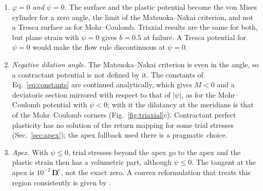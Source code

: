 \documentclass[11pt,a4paper]{article}
\begin{document}
\begin{enumerate}
  \item \emph{$\varphi = 0$ and $\psi = 0$.} The surface and the plastic potential become the
        von Mises cylinder for a zero angle, the limit of the Matsuoka--Nakai criterion, and not
        a Tresca surface as for Mohr--Coulomb. Triaxial results are the same for both, but plane
        strain with $\psi = 0$ gives $b = 0.5$ at failure. A Tresca potential for $\psi = 0$ would
        make the flow rule discontinuous at $\psi = 0$.
  \item \emph{Negative dilation angle.} The Matsuoka--Nakai criterion is even in the angle, so a
        contractant potential is not defined by it. The constants of Eq.~\eqref{eq:constants} are
        continued analytically, which gives $M < 0$ and a deviatoric section mirrored with respect
        to that of $|\psi|$, as for the Mohr--Coulomb potential with $\psi < 0$; with it the
        dilatancy at the meridians is that of the Mohr--Coulomb corners (Fig.~\ref{fig:triaxial}c).
        Contractant perfect plasticity has no solution of the return mapping for some trial
        stresses (Sec.~\ref{sec:apex}); the apex fallback used there is a pragmatic choice.
  \item \emph{Apex.} With $\psi \le 0$, trial stresses beyond the apex go to the apex and the
        plastic strain then has a volumetric part, although $\psi \le 0$. The tangent at the
        apex is $10^{-2}\,\mathbf{D}^e$, not the exact zero. A convex reformulation that treats
        this region consistently is given by \citet{Panteghini_2014}.
\end{enumerate}



\end{document}
